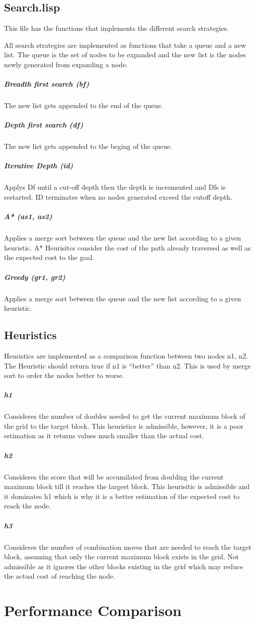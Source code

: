 \documentclass[paper=a4, fontsize=11pt]{scrartcl}
\numberwithin{equation}{section}		%
\numberwithin{figure}{section}			%
\numberwithin{table}{section}				%
\begin{document}
\subsection{Search.lisp}
This file has the functions that implements the different search strategies.

All search strategies are implemented as functions that take a queue and a new list. The queue is the set of nodes to be expanded and the new list is the nodes newly generated from expanding a node.

\subparagraph{Breadth first search (bf)}
The new list gets appended to the end of the queue.

\subparagraph{Depth first search (df)}
The new list gets appended to the beging of the queue.

\subparagraph{Iterative Depth (id)}
Applys Df until a cut-off depth then the depth is incremented and Dfs is restarted. ID terminates when no nodes generated exceed the cutoff depth.

\subparagraph{A* (as1, as2)}
Applies a merge sort between the queue and the new list according to a given heuristic.
A* Heurisitcs consider the cost of the path already traversed as well as the expected
cost to the goal.

\subparagraph{Greedy (gr1, gr2)}
Applies a merge sort between the queue and the new list according to a given heuristic.

\subsection{Heuristics}
Heuristics are implemented as a comparison function between two nodes n1, n2. The Heuristic should return true if n1 is ``better'' than n2. This is used by merge sort to order the nodes better to worse.

\subparagraph{h1} Consideres the number of doubles needed to get the current maximum block of the grid to the target block. This heuristics is admissible, however, it is a poor estimation as it returns values much smaller than the actual cost.

\subparagraph{h2}
Consideres the score that will be accumilated from doubling the current maximum block till it reaches the largest block.
This heurisitic is admissible and it dominates h1 which is why it is a better estimation of the expected cost to reach the node.
 
\subparagraph{h3}
Consideres the number of combination moves that are needed to reach the target block, assuming that only the current maximum block exists in the grid.
Not admissible as it ignores the other blocks existing in the grid which may reduce the actual cost of reaching the node.

\section{Performance Comparison}

\end{document}
